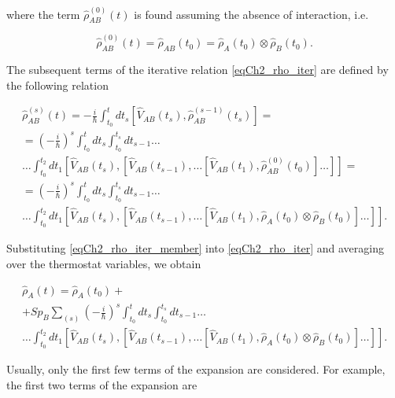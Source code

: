 where the term \(\hat{\rho}^{(0)}_{AB}\left(t\right)\) is found assuming the absence of interaction, i.e.

\[
\hat{\rho}^{(0)}_{AB}\left(t\right) = \hat{\rho}_{AB}\left(t_0\right) = 
\hat{\rho}_{A}\left(t_0\right)
\otimes
\hat{\rho}_{B}\left(t_0\right).
\]

The subsequent terms of the iterative relation \eqref{eqCh2_rho_iter} are defined by the following relation

\begin{eqnarray}
\hat{\rho}^{(s)}_{AB}\left(t\right) = - \frac{i}{\hbar}\int_{t_0}^{t} dt_s
\left[\hat{V}_{AB}\left(t_s\right), \hat{\rho}^{(s - 1)}_{AB}\left(t_s\right)
\right] = 
\nonumber \\
= \left(- \frac{i}{\hbar}\right)^{s}\int_{t_0}^{t} dt_{s}
\int_{t_0}^{t_s} dt_{s -1} \dots
\nonumber \\
\dots \int_{t_0}^{t_2} dt_1 
\left[\hat{V}_{AB}\left(t_s\right), 
\left[\hat{V}_{AB}\left(t_{s -1}\right),
\dotsc
\left[\hat{V}_{AB}\left(t_1\right),
\hat{\rho}^{(0)}_{AB}\left(t_0\right)
\right]
\dots
\right]
\right] =
\nonumber \\
= \left(- \frac{i}{\hbar}\right)^{s}\int_{t_0}^{t} dt_{s}
\int_{t_0}^{t_{s}} dt_{s - 1} \dots
\nonumber \\
\dots \int_{t_0}^{t_2} dt_1 
\left[\hat{V}_{AB}\left(t_s\right), 
\left[\hat{V}_{AB}\left(t_{s-1}\right),
\dotsc
\left[\hat{V}_{AB}\left(t_1\right),
\hat{\rho}_{A}\left(t_0\right)
\otimes
\hat{\rho}_{B}\left(t_0\right)
\right]
\dotsc
\right]
\right].
\label{eqCh2_rho_iter_member}
\end{eqnarray}

Substituting \eqref{eqCh2_rho_iter_member} into \eqref{eqCh2_rho_iter} and averaging over the thermostat variables, we obtain

\begin{eqnarray}
\hat{\rho}_{A}\left(t\right) = 
\hat{\rho}_{A}\left(t_0\right) + 
\nonumber \\
+ Sp_{B} \sum_{\left(s\right)} \left(- \frac{i}{\hbar}\right)^{s}\int_{t_0}^{t} dt_{s} \int_{t_0}^{t_s} dt_{s-1} \dots
\nonumber \\
\dots \int_{t_0}^{t_{2}} dt_1 
\left[\hat{V}_{AB}\left(t_s\right), 
\left[\hat{V}_{AB}\left(t_{s - 1}\right),
\dotsc
\left[\hat{V}_{AB}\left(t_1\right),
\hat{\rho}_{A}\left(t_0\right)
\otimes
\hat{\rho}_{B}\left(t_0\right)
\right]
\dots
\right]
\right].
\label{eqCh2_rho_sequance}
\end{eqnarray}

Usually, only the first few terms of the expansion are considered. For example, the first two terms of the expansion are

